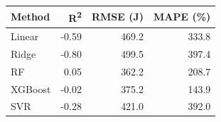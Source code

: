 \begin{tabular}{@{}lrrr@{}}
\toprule
\textbf{Method} & \textbf{R\textsuperscript{2}} & \textbf{RMSE (J)} & \textbf{MAPE (\%)} \\
\midrule
Linear & -0.59 & 469.2 & 333.8 \\
Ridge & -0.80 & 499.5 & 397.4 \\
RF & 0.05 & 362.2 & 208.7 \\
XGBoost & -0.02 & 375.2 & 143.9 \\
SVR & -0.28 & 421.0 & 392.0 \\
\bottomrule
\end{tabular}